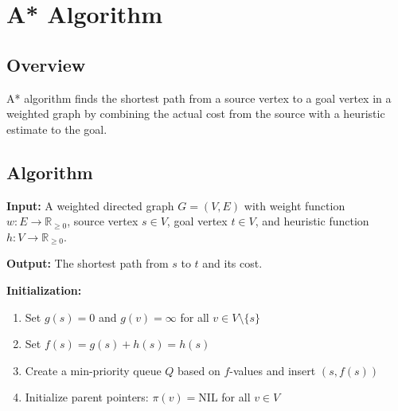 \documentclass{article}
\begin{document}
\section{A* Algorithm}

\subsection{Overview}
A* algorithm finds the shortest path from a source vertex to a goal vertex in a weighted graph by combining the actual cost from the source with a heuristic estimate to the goal.

\subsection{Algorithm}
\textbf{Input:} A weighted directed graph $G = (V, E)$ with weight function $w: E \to \mathbb{R}_{\geq 0}$, source vertex $s \in V$, goal vertex $t \in V$, and heuristic function $h: V \to \mathbb{R}_{\geq 0}$.

\textbf{Output:} The shortest path from $s$ to $t$ and its cost.

\textbf{Initialization:}
\begin{enumerate}
    \item Set $g(s) = 0$ and $g(v) = \infty$ for all $v \in V \setminus \{s\}$
    \item Set $f(s) = g(s) + h(s) = h(s)$
    \item Create a min-priority queue $Q$ based on $f$-values and insert $(s, f(s))$
    \item Initialize parent pointers: $\pi(v) = \text{NIL}$ for all $v \in V$
\end{enumerate}
\end{document}
